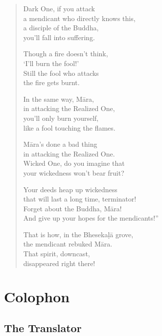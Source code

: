 \documentclass[12pt,openany]{book}%
\let\oldbackmatter\backmatter
\renewcommand{\backmatter}{%
\chapterfont{\setstretch{.85}\normalfont\centering}%
\sectionfont{\setstretch{.85}\Semiboldsubheadfont}%
\oldbackmatter}
\begin{document}
\begin{verse}
Dark One, if you attack \\
a mendicant who directly knows this, \\
a disciple of the Buddha, \\
you’ll fall into suffering. 

Though a fire doesn’t think, \\
‘I’ll burn the fool!’ \\
Still the fool who attacks \\
the fire gets burnt. 

In the same way, \textsanskrit{Māra}, \\
in attacking the Realized One, \\
you’ll only burn yourself, \\
like a fool touching the flames. 

\textsanskrit{Māra}’s done a bad thing \\
in attacking the Realized One. \\
Wicked One, do you imagine that \\
your wickedness won’t bear fruit? 

Your deeds heap up wickedness \\
that will last a long time, terminator! \\
Forget about the Buddha, \textsanskrit{Māra}! \\
And give up your hopes for the mendicants!” 

That is how, in the \textsanskrit{Bhesekaḷā} grove, \\
the mendicant rebuked \textsanskrit{Māra}. \\
That spirit, downcast, \\
disappeared right there! 

%
\end{verse}

%
\backmatter%
\chapter*{Colophon}

\section*{The Translator}
\end{document}
